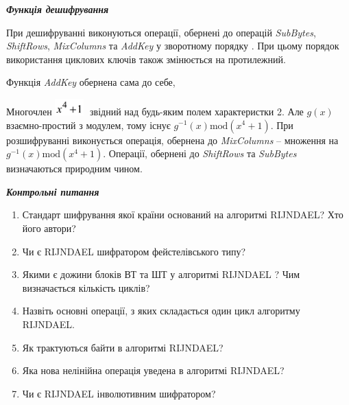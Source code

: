 \documentclass[a4paper]{article}
\newcommand\liststyleWWviiiNumlviii{%
\renewcommand\theenumi{\arabic{enumi}}
\renewcommand\theenumii{\alph{enumii}}
\renewcommand\theenumiii{\roman{enumiii}}
\renewcommand\theenumiv{\arabic{enumiv}}
\renewcommand\labelenumi{\theenumi.}
\renewcommand\labelenumii{\theenumii.}
\renewcommand\labelenumiii{\theenumiii.}
\renewcommand\labelenumiv{\theenumiv.}
}
\newcounter{}
\begin{document}
\bigskip


\bigskip

{\centering\bfseries\itshape
Функція дешифрування
\par}


\bigskip


\bigskip

При дешифруванні виконуються операції, обернені до операцій \textit{SubBytes},
\textit{ShiftRows}, \textit{MixColumns}\textit{ }та \textit{AddKey} у
зворотному порядку . При цьому порядок використання циклових ключів також
змінюється на протилежний.

Функція \textit{AddKey} обернена сама до себе,

Многочлен 
\includegraphics[width=0.4307in,height=0.25in]{crypt-img/crypt-img336.png}  $ $
звідний над будь-яким полем характеристки 2. Але  ${g(x)}$ взаємно-простий з
модулем, тому існує  ${g^{{-1}}(x)\text{mod}(x^{{4}}+1)}$. При розшифруванні
виконується операція, обернена до \textit{MixColumns} – множення на 
${g^{{-1}}(x)\text{mod}(x^{{4}}+1)}$. Операції, обернені до  \textit{ShiftRows
}та \textit{SubBytes }визначаються природним чином.


\bigskip


\bigskip

{\centering\bfseries\itshape
Контрольні питання
\par}


\bigskip


\bigskip

\liststyleWWviiiNumlviii
\begin{enumerate}
\item Стандарт шифрування якої країни оснований на алгоритмі RIJNDAEL? Хто його
автори?
\item Чи є  RIJNDAEL шифратором фейстелівського типу?
\item Якими є дожини блоків ВТ та ШТ у алгоритмі RIJNDAEL ? Чим визначається
кількість циклів?
\item Назвіть основні операції, з яких складається один цикл алгоритму RIJNDAEL.
\item Як трактуються байти в алгоритмі RIJNDAEL?
\item Яка нова нелінійна операція уведена в алгоритмі RIJNDAEL?
\item Чи є RIJNDAEL інволютивним шифратором?
\end{enumerate}
\end{document}
